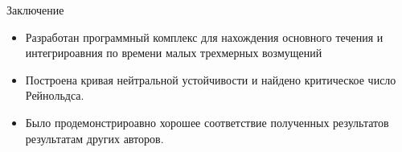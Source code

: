 \documentclass{beamer}
\begin{document}
\begin{frame}{Заключение}
	\begin{block}{}
		\begin{itemize}
			\item Разработан программный комплекс для нахождения основного течения и интегрироавния по времени малых трехмерных возмущений
 			\item Построена кривая нейтральной устойчивости и найдено критическое число Рейнольдса.
			\item Было продемонстрироавно хорошее соответствие полученных результатов результатам других авторов.
		\end{itemize}
	\end{block} 
\end{frame}
\end{document}
